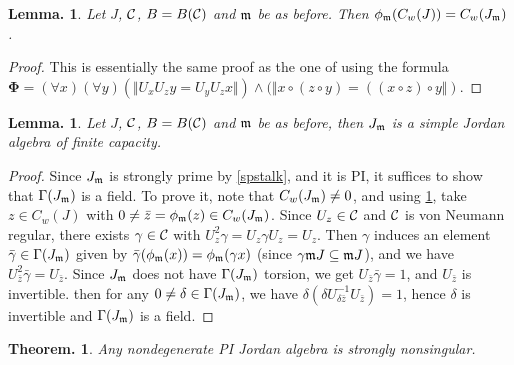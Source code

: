 \documentclass[a4paper,twoside,11pt]{article}
\theoremstyle{plain}
\theoremstyle{miestilo}
\newtheorem{teorema}[subsection]{Theorem.}
\newtheorem{lema}[subsection]{Lemma.}
\theoremstyle{misnotas}
\begin{document}
\begin{lema}\label{centrstalk}Let $J$, $\mathcal C$, $B= B(\mathcal C)$ and $\frak m$ be as before. Then $\phi_{\frak
m}(C_w(J))= C_w(J_{\frak m})$.\end{lema}

\begin{proof} This is essentially the same proof as the one of \cite[3.2.13]{bmami} using the formula ${\bm \Phi} = (\forall x)(\forall y)(\Vert U_xU_zy = U_yU_zx\Vert)\land(\Vert x\circ (z\circ
y) = ((x\circ z)\circ y\Vert)$.\end{proof}


\begin{lema}\label{simplestalks}Let $J$, $\mathcal C$, $B= B(\mathcal C)$ and $\frak m$ be as before, then $J_{\frak
m}$ is a simple Jordan algebra of finite capacity.\end{lema}

\begin{proof} Since $J_{\frak m}$ is strongly prime by \ref{spstalk}, and it is PI, it suffices to
show that $\Gamma(J_{\frak m})$ is a field. To prove it, note that $C_w(J_{\frak m}) \ne
0$, and using \ref{centrstalk}, take
$z\in C_w(J)$ with $0 \ne \bar z = \phi_{\frak m}(z) \in C_w(J_{\frak m})$. Since $U_z\in \mathcal C$
and $\mathcal C$ is von Neumann regular, there exists $\gamma \in \mathcal C$ with $U_z^2\gamma=U_z\gamma U_z= U_z$. Then
$\gamma$ induces an element $\bar \gamma \in \Gamma(J_{\frak m})$ given by ${\bar
\gamma}(\phi_{\frak m}(x)) = \phi_{\frak m}(\gamma x)$ (since $\gamma\frak mJ\subseteq \frak
mJ$), and we have $U_{\bar z}^2\bar\gamma = U_{\bar z}$. Since $J_{\frak m}$ does not have
$\Gamma( J_{\frak m})$ torsion, we get $U_{\bar z}\bar \gamma = 1$, and $U_{\bar z}$ is
invertible. then for any $0 \ne \delta \in \Gamma(J_{\frak m})$, we have $\delta (\delta
U_{\delta
\bar z}^{-1}U_{\bar z}) = 1$, hence $\delta$ is invertible and $\Gamma(J_{\frak m})$ is a
field.\end{proof}

\begin{teorema}Any nondegenerate PI Jordan algebra is strongly nonsingular.\end{teorema}
\end{document}
